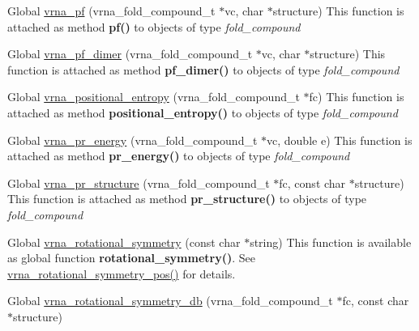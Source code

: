 \begin{DoxyRefList}
\item[Global \mbox{\hyperlink{group__part__func__global_ga29e256d688ad221b78d37f427e0e99bc}{vrna\+\_\+pf}} (vrna\+\_\+fold\+\_\+compound\+\_\+t $\ast$vc, char $\ast$structure)]\label{wrappers__wrappers000109}%
%
 This function is attached as method {\bfseries{pf()}} to objects of type {\itshape fold\+\_\+compound}  
\item[Global \mbox{\hyperlink{group__part__func__global_ga4e5c7d06c302a7c59fc0d64dc142ca63}{vrna\+\_\+pf\+\_\+dimer}} (vrna\+\_\+fold\+\_\+compound\+\_\+t $\ast$vc, char $\ast$structure)]\label{wrappers__wrappers000110}%
%
 This function is attached as method {\bfseries{pf\+\_\+dimer()}} to objects of type {\itshape fold\+\_\+compound}  
\item[Global \mbox{\hyperlink{group__part__func__global_ga4ec346141028c7bcd15bc235c408b6e9}{vrna\+\_\+positional\+\_\+entropy}} (vrna\+\_\+fold\+\_\+compound\+\_\+t $\ast$fc)]\label{wrappers__wrappers000113}%
%
 This function is attached as method {\bfseries{positional\+\_\+entropy()}} to objects of type {\itshape fold\+\_\+compound}  
\item[Global \mbox{\hyperlink{equilibrium__probs_8h_aa88e17336daede0e6db4da1f3252c031}{vrna\+\_\+pr\+\_\+energy}} (vrna\+\_\+fold\+\_\+compound\+\_\+t $\ast$vc, double e)]\label{wrappers__wrappers000115}%
%
 This function is attached as method {\bfseries{pr\+\_\+energy()}} to objects of type {\itshape fold\+\_\+compound}  
\item[Global \mbox{\hyperlink{group__part__func__global_ga882c35d9dd775c1275593b3b6a966bec}{vrna\+\_\+pr\+\_\+structure}} (vrna\+\_\+fold\+\_\+compound\+\_\+t $\ast$fc, const char $\ast$structure)]\label{wrappers__wrappers000114}%
%
 This function is attached as method {\bfseries{pr\+\_\+structure()}} to objects of type {\itshape fold\+\_\+compound}  
\item[Global \mbox{\hyperlink{group__combinatorics__utils_gae1dec02c4b63f303ce06a9293d316762}{vrna\+\_\+rotational\+\_\+symmetry}} (const char $\ast$string)]\label{wrappers__wrappers000018}%
%
 This function is available as global function {\bfseries{rotational\+\_\+symmetry()}}. See \mbox{\hyperlink{group__combinatorics__utils_ga294d48935fcac87ab335d771fe289ecb}{vrna\+\_\+rotational\+\_\+symmetry\+\_\+pos()}} for details.  
\item[Global \mbox{\hyperlink{group__combinatorics__utils_gad42ffd53025bed9d636d811748db7c5a}{vrna\+\_\+rotational\+\_\+symmetry\+\_\+db}} (vrna\+\_\+fold\+\_\+compound\+\_\+t $\ast$fc, const char $\ast$structure)]\label{wrappers__wrappers000020}%

\end{DoxyRefList}
